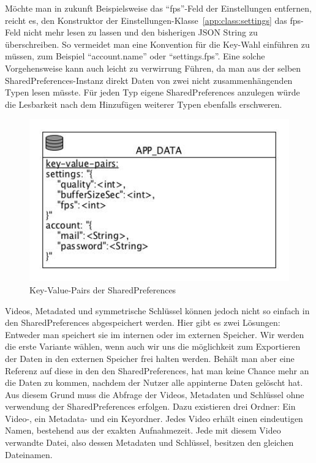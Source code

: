Möchte man in zukunft Beispielsweise das ``fps''-Feld der Einstellungen entfernen, reicht es, den Konstruktor der Einstellungen-Klasse~\eqref{app:class:settings} das fps-Feld nicht mehr lesen zu lassen und den bisherigen JSON String zu überschreiben. So vermeidet man eine Konvention für die Key-Wahl einführen zu müssen, zum Beispiel ``account.name'' oder ``settings.fps''. Eine solche Vorgehensweise kann auch leicht zu verwirrung Führen, da man aus der selben SharedPreferences-Instanz direkt Daten von zwei nicht zusammenhängenden Typen lesen müsste. Für jeden Typ eigene SharedPreferences anzulegen würde die Lesbarkeit nach dem Hinzufügen weiterer Typen ebenfalls erschweren.
\begin{figure}[ht]
	\centering
\includegraphics[width=1\textwidth]{./resources/Diagramme/App/sharedpreferences_overview.jpg}
\caption{Key-Value-Pairs der SharedPreferences}
	\label{fig:sharedpreferences_overview}
\end{figure}
Videos, Metadated und symmetrische Schlüssel können jedoch nicht so einfach in den SharedPreferences abgespeichert werden. Hier gibt es zwei Lösungen: Entweder man speichert sie im internen oder im externen Speicher. Wir werden die erste Variante wählen, wenn auch wir uns die möglichkeit zum Exportieren der Daten in den externen Speicher frei halten werden. Behält man aber eine Referenz auf diese in den den SharedPreferences, hat man keine Chance mehr an die Daten zu kommen, nachdem der Nutzer alle appinterne Daten gelöscht hat.\newline
Aus diesem Grund muss die Abfrage der Videos, Metadaten und Schlüssel ohne verwendung der SharedPreferences erfolgen. Dazu existieren drei Ordner: Ein Video-, ein Metadata- und ein Keyordner. Jedes Video erhält einen eindeutigen Namen, bestehend aus der exakten Aufnahmezeit. Jede mit diesem Video verwandte Datei, also dessen Metadaten und Schlüssel, besitzen den gleichen Dateinamen.\newline

